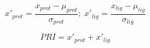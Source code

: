 \begin{equation}
x'_{prot} = \frac{x_{prot} - \mu_{prot}}{\sigma_{prot}}; \; x'_{lig} = \frac{x_{lig} - \mu_{lig}}{\sigma_{lig}}
\end{equation}

\begin{equation}
PRI = x'_{prot} + x'_{lig}
\end{equation}